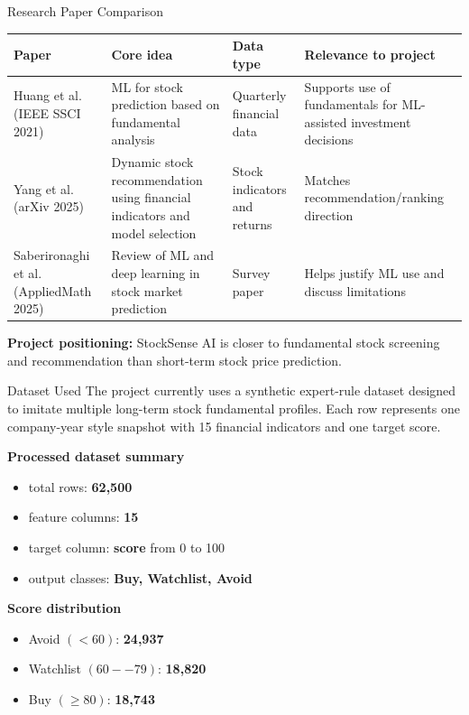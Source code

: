 \documentclass[aspectratio=169]{beamer}
\begin{document}
\begin{frame}{Research Paper Comparison}
\small
\begin{tabular}{p{3.4cm} p{4.7cm} p{2.1cm} p{3.0cm}}
\toprule
\textbf{Paper} & \textbf{Core idea} & \textbf{Data type} & \textbf{Relevance to project} \\
\midrule
Huang et al. (IEEE SSCI 2021) & ML for stock prediction based on fundamental analysis & Quarterly financial data & Supports use of fundamentals for ML-assisted investment decisions \\
\addlinespace
Yang et al. (arXiv 2025) & Dynamic stock recommendation using financial indicators and model selection & Stock indicators and returns & Matches recommendation/ranking direction \\
\addlinespace
Saberironaghi et al. (AppliedMath 2025) & Review of ML and deep learning in stock market prediction & Survey paper & Helps justify ML use and discuss limitations \\
\bottomrule
\end{tabular}

\vspace{0.25cm}
\textbf{Project positioning:} StockSense AI is closer to fundamental stock screening and recommendation than short-term stock price prediction.
\end{frame}

\begin{frame}{Dataset Used}
\small
\justifying
The project currently uses a synthetic expert-rule dataset designed to imitate multiple long-term stock fundamental profiles. Each row represents one company-year style snapshot with 15 financial indicators and one target score.

\vspace{0.2cm}
\textbf{Processed dataset summary}
\begin{itemize}
  \item total rows: \textbf{62,500}
  \item feature columns: \textbf{15}
  \item target column: \textbf{score} from 0 to 100
  \item output classes: \textbf{Buy, Watchlist, Avoid}
\end{itemize}

\textbf{Score distribution}
\begin{itemize}
  \item Avoid \((<60)\): \textbf{24,937}
  \item Watchlist \((60--79)\): \textbf{18,820}
  \item Buy \((\geq80)\): \textbf{18,743}
\end{itemize}
\end{frame}
\end{document}
